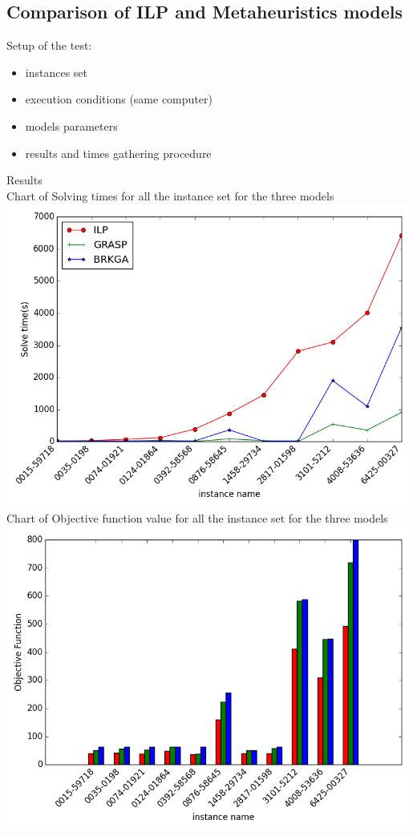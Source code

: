 \subsection{Comparison of ILP and Metaheuristics models}

Setup of the test:\\
\begin{itemize}
	\item instances set
	\item execution conditions (same computer)
	\item models parameters
	\item results and times gathering procedure
\end{itemize}

Results\\
Chart of Solving times for all the instance set for the three models\\

\includegraphics[width=1\textwidth]{./img/ILPvsMetah_times.png}\\[0.8cm] 


Chart of Objective function value for all the instance set for the three models\\


\includegraphics[width=1\textwidth]{./img/ILPvsMetah_objf.png}\\[0.8cm] 




\pagebreak
